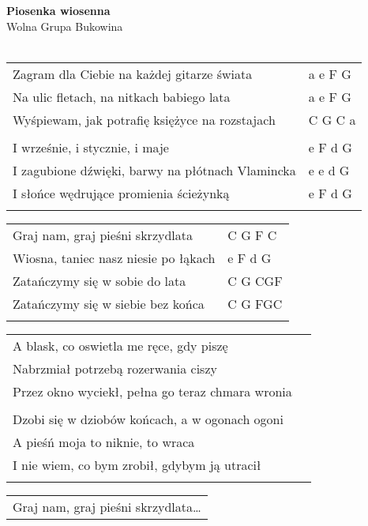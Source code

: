 \documentclass[a5paper]{article}
\begin{document}


\noindent
\fontsize{12pt}{15pt}\selectfont
\textbf{Piosenka wiosenna} \\
\fontsize{8pt}{10pt}\selectfont
Wolna Grupa Bukowina \\ \\
\fontsize{10pt}{12pt}\selectfont
{}
\begin{tabular}{@{}p{8.50cm}p{3cm}@{}}
\noindent
Zagram dla Ciebie na każdej gitarze świata & a e F G \\
Na ulic fletach, na nitkach babiego lata & a e F G \\
Wyśpiewam, jak potrafię księżyce na rozstajach & C G C a \\ \\
I wrześnie, i stycznie, i maje & e F d G \\
I zagubione dźwięki, barwy na płótnach Vlamincka & e e d G \\
I słońce wędrujące promienia ścieżynką & e F d G \\ \\
\end{tabular}

\noindent
\begin{tabular}{@{}p{7.50cm}p{3cm}@{}}
Graj nam, graj pieśni skrzydlata & C G F C \\
Wiosna, taniec nasz niesie po łąkach & e F d G \\
Zatańczymy się w sobie do lata & C G CGF \\
Zatańczymy się w siebie bez końca & C G FGC \\ \\
\end{tabular}

\noindent
\begin{tabular}{@{}p{8.50cm}p{3cm}@{}}
A blask, co oswietla me ręce, gdy piszę \\
Nabrzmiał potrzebą rozerwania ciszy \\
Przez okno wyciekł, pełna go teraz chmara wronia \\ \\
Dzobi się w dziobów końcach, a w ogonach ogoni \\ 
A pieśń moja to niknie, to wraca \\
I nie wiem, co bym zrobił, gdybym ją utracił \\ \\
\end{tabular}

\noindent
\begin{tabular}{@{}p{8.00cm}@{}}
Graj nam, graj pieśni skrzydlata…
\end{tabular}
\end{document}
